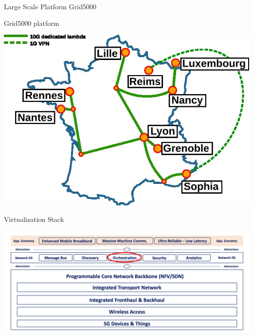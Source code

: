 \documentclass[8pt]{beamer}
\newcommand{\1}{\mathbbm 1}
\begin{document}
\begin{frame}{Large Scale Platform Grid5000}

Grid5000 platform

\begin{center}
\includegraphics[scale=0.48]{figures/grid.jpg}
\end{center}

\end{frame}

\begin{frame}{Virtualization Stack}


\begin{center}
\includegraphics[scale=0.15]{figures/architecture.png}
\end{center}

\end{frame}




\end{document}
